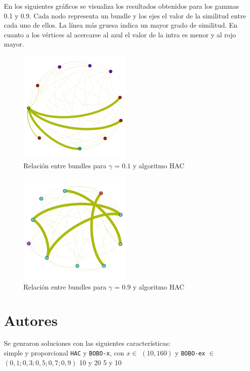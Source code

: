 En los siguientes gráficos se visualiza los resultados obtenidos para los gammas 0.1 y 0.9. Cada 
nodo representa un bundle y los ejes el valor de la similitud entre cada uno de ellos. La línea más 
gruesa indica un mayor grado de similitud. En cuanto a los vértices al acercarse al azul el valor 
de la intra es menor y al rojo mayor.
\begin{figure}[H]
  \centering
    \includegraphics[width=0.5\textwidth]{resultados/papers/intra_inter/hac01.png}
  \caption{Relación entre bundles para $\gamma$ = $0.1$ y algoritmo HAC}
  \label{res:img-gamma01-hac}
\end{figure}

\begin{figure}[H]
  \centering
    \includegraphics[width=0.5\textwidth]{resultados/papers/intra_inter/hac09.png}
  \caption{Relación entre bundles para $\gamma$ = $0.9$ y algoritmo HAC}
  \label{res:img-gamma09-hac}
\end{figure}

\section{Autores}
Se genraron soluciones con las siguientes características:\\
\Solucion
{}
{simple y proporcional}
{\texttt{HAC} y \texttt{BOBO-x}, con  $x \in$ $(10, 160)$ y \texttt{BOBO-ex}}
{$\in$ $(0,1; 0,3; 0,5; 0,7; 0,9)$}
{10 y 20}
{5 y 10}

